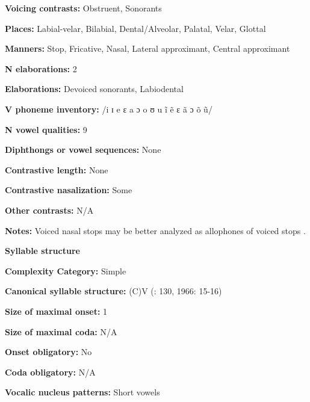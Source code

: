 \textbf{Voicing contrasts:} Obstruent, Sonorants



\textbf{Places:} Labial-velar, Bilabial, Dental/Alveolar, Palatal, Velar, Glottal



\textbf{Manners:} Stop, Fricative, Nasal, Lateral approximant, Central approximant



\textbf{N elaborations:} 2



\textbf{Elaborations:} Devoiced sonorants, Labiodental



\textbf{V phoneme inventory:} /i ɪ e ɛ a ɔ o ʊ u ĩ ẽ ɛ ã ɔ õ ũ/



\textbf{N vowel qualities:} 9



\textbf{Diphthongs or vowel sequences:} None



\textbf{Contrastive length:} None



\textbf{Contrastive nasalization:} Some



\textbf{Other contrasts:} N/A



\textbf{Notes:} Voiced nasal stops may be better analyzed as allophones of voiced stops \citep[176]{Newman1986}.



\textbf{Syllable structure}



\textbf{Complexity Category:} Simple



\textbf{Canonical syllable structure:} (C)V (\citealt{Innes1981}: 130, 1966: 15-16)



\textbf{Size of maximal onset:} 1



\textbf{Size of maximal coda:} N/A



\textbf{Onset obligatory:} No



\textbf{Coda obligatory:} N/A



\textbf{Vocalic nucleus patterns:} Short vowels



